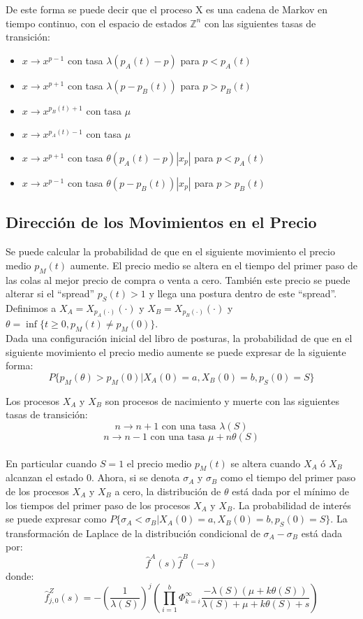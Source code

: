 \documentclass[11pt]{article}
\numberwithin{equation}{section} %
\begin{document}
De este forma se puede decir que el proceso X es una cadena de Markov en tiempo continuo, con el espacio de estados $\mathbb{Z}^n$ con las siguientes tasas de transición:
\begin{itemize}
\item $x\rightarrow x^{p-1}$ con tasa $\lambda(p_A(t)-p)$ para $p<p_A(t)$
\item $x\rightarrow x^{p+1}$ con tasa $\lambda(p-p_B(t))$ para $p>p_B(t)$
\item $x\rightarrow x^{p_B(t)+1}$ con tasa $\mu$
\item $x\rightarrow x^{p_A(t)-1}$ con tasa $\mu$
\item $x\rightarrow x^{p+1}$ con tasa $\theta(p_A(t)-p)|x_p|$ para $p<p_A(t)$
\item $x\rightarrow x^{p-1}$ con tasa $\theta(p-p_B(t))|x_p|$ para $p>p_B(t)$
\end{itemize}

\subsection{Dirección de los Movimientos en el Precio}

Se puede calcular la probabilidad de que en el siguiente movimiento el precio medio $p_M(t)$ aumente. El precio medio se altera en el tiempo del primer paso de las colas al mejor precio de compra o venta a cero. También este precio se puede alterar si el ``spread'' $p_S(t)>1$ y llega una postura dentro de este ``spread''. Definimos a $X_A=X_{p_A(\cdot)}(\cdot)$ y $X_B=X_{p_B(\cdot)}(\cdot)$ y $\theta=\inf\{t\geq 0, p_M(t) \neq p_M(0)\}$.\\

Dada una configuración inicial del libro de posturas, la probabilidad de que en el siguiente movimiento el precio medio aumente se puede expresar de la siguiente forma:
\[
P\{p_M(\theta)>p_M(0)|X_A(0)=a,X_B(0)=b,p_S(0)=S\}
\]

Los procesos $X_A$ y $X_B$ son procesos de nacimiento y muerte con las siguientes tasas de transición:
\[
n\rightarrow n+1 \text{ con una tasa }\lambda(S)
\]
\[
n\rightarrow n-1 \text{ con una tasa }\mu+n\theta(S)
\]\\

En particular cuando $S=1$ el precio medio $p_M(t)$ se altera cuando $X_A$ ó $X_B$ alcanzan el estado 0. Ahora, si se denota $\sigma_A$ y $\sigma_B$ como el tiempo del primer paso de los procesos $X_A$ y $X_B$ a cero, la distribución de $\theta$ está dada por el mínimo de los tiempos del primer paso de los procesos $X_A$ y $X_B$. La probabilidad de interés se puede expresar como $P\{\sigma_A<\sigma_B|X_A(0)=a,X_B(0)=b,p_S(0)=S\}$. La transformación de Laplace de la distribución condicional de $\sigma_A-\sigma_B$ está dada por:
\[
\hat{f}^A(s)\hat{f}^B(-s)
\]
donde:
\[
\hat{f}_{j,0}^Z(s)=-\left(\frac{1}{\lambda(S)}\right)^j\left( \prod_{i=1}^b \Phi_{k=i}^\infty \frac{-\lambda(S)(\mu+k\theta(S))}{\lambda(S)+\mu+k\theta(S)+s} \right)
\]\\
\end{document}
